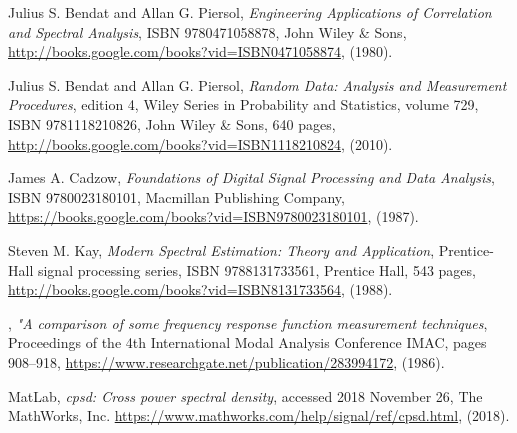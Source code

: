 \begin{thebibliography}{99}

  Julius S. Bendat and Allan G. Piersol, 
                      \emph{Engineering Applications of Correlation and Spectral Analysis}, 
                      ISBN 9780471058878, John Wiley \& Sons,
                      \url{http://books.google.com/books?vid=ISBN0471058874},
                      (1980).

  Julius S. Bendat and Allan G. Piersol, 
                      \emph{Random Data: Analysis and Measurement Procedures}, edition 4,
                      {Wiley Series in Probability and Statistics}, volume 729,
                      ISBN 9781118210826, John Wiley \& Sons, 640 pages,
                      \url{http://books.google.com/books?vid=ISBN1118210824},
                      (2010).

      {James A. Cadzow},
                      \emph{Foundations of Digital Signal Processing and Data Analysis},
                      ISBN {9780023180101}, {Macmillan Publishing Company},
                      \url{https://books.google.com/books?vid=ISBN9780023180101},
                      (1987).

     Steven M. Kay,
                      \emph{Modern Spectral Estimation: Theory and Application},
                      Prentice-Hall signal processing series,
                      ISBN 9788131733561, Prentice Hall, 543 pages,
                      \url{http://books.google.com/books?vid=ISBN8131733564},
                      (1988).

,
                      \emph{"A comparison of some frequency response function measurement techniques},
                      {Proceedings of the 4th International Modal Analysis Conference IMAC},
                      pages 908--918,
                      \url{https://www.researchgate.net/publication/283994172},
                      (1986).

 {MatLab},
                      \emph{cpsd: Cross power spectral density},
                      {accessed 2018 November 26},
                      {The MathWorks, Inc.}
                      \url{https://www.mathworks.com/help/signal/ref/cpsd.html},
                      (2018).


\end{thebibliography}
